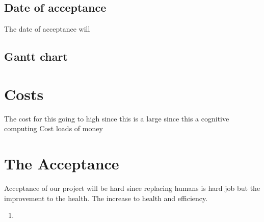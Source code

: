 \documentclass{article}
\begin{document}
\subsection{Date of acceptance}
The date of acceptance will 

\subsection{Gantt chart}







\section{Costs}
The cost for this going to high since this is a large since this a cognitive computing 
Cost loads of money

\section{The Acceptance}
Acceptance of our project will be hard since replacing humans is hard job but the improvement to the health. The increase to health and efficiency.

\begin{enumerate}
    \item 
\end{enumerate}
\end{document}
